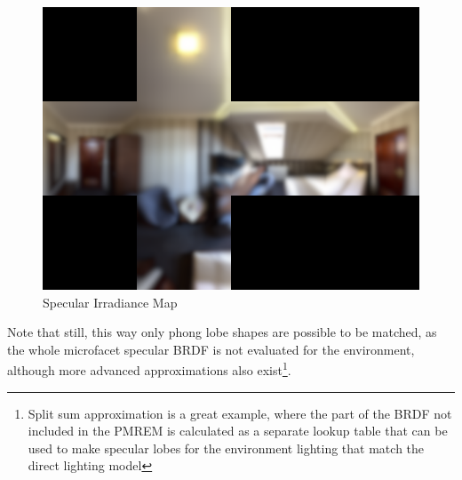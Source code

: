 \begin{figure}[ht]
    \centering
    \includegraphics[scale=0.36,clip=true]{./image/envl_rad.png}
    \caption{Specular Irradiance Map}
\label{fig:envlrad}
\end{figure}

Note that still, this way only phong lobe shapes are possible to be matched, as the whole microfacet specular
BRDF is not evaluated for the environment, although more advanced approximations also exist\footnote{Split sum approximation is a great
example, where the part of the BRDF not included in the PMREM is calculated as a separate lookup table that can be used to make
specular lobes for the environment lighting that match the direct lighting model\cite{lighting:ref40}}.
